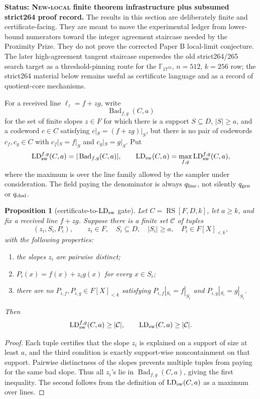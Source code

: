 \documentclass[11pt]{article}
\newtheorem{proposition}{Proposition}
\newcommand{\F}{\mathbb F}
\newcommand{\RS}{\operatorname{RS}}
\newcommand{\qline}{q_{\rm line}}
\newcommand{\qgen}{q_{\rm gen}}
\newcommand{\qchal}{q_{\rm chal}}
\begin{document}
\textbf{Status: \textsc{New-local} finite theorem infrastructure plus
subsumed strict264 proof record.}
The results in this section are deliberately finite and certificate-facing.  They
are meant to move the experimental ledger from lower-bound numerators toward the
integer agreement staircase needed by the Proximity Prize.  They do not prove the
corrected Paper B local-limit conjecture.  The later
high-agreement tangent staircase supersedes the old strict264/265 search target
as a threshold-pinning route for the \(\F_{17^{32}}\), \(n=512\), \(k=256\)
row; the strict264 material below remains useful as certificate language and
as a record of quotient-core mechanisms.

For a received line \(\ell_z=f+zg\), write
\[
  \operatorname{Bad}_{f,g}(C,a)
\]
for the set of finite slopes \(z\in F\) for which there is a support
\(S\subseteq D\), \(|S|\ge a\), and a codeword \(c\in C\) satisfying
\(c|_S=(f+zg)|_S\), but there is no pair of codewords
\(c_f,c_g\in C\) with \(c_f|_S=f|_S\) and \(c_g|_S=g|_S\).  Put
\[
  \operatorname{LD}_{\rm sw}^{f,g}(C,a)
  =|\operatorname{Bad}_{f,g}(C,a)|,
  \qquad
  \operatorname{LD}_{\rm sw}(C,a)
  =\max_{f,g}\operatorname{LD}_{\rm sw}^{f,g}(C,a),
\]
where the maximum is over the line family allowed by the sampler under
consideration.  The field paying the denominator is always \(\qline\), not
silently \(\qgen\) or \(\qchal\).

\begin{proposition}[certificate-to-\(\operatorname{LD}_{\rm sw}\) gate]
\label{prop:certificate-to-ldsw}
Let \(C=\RS[F,D,k]\), let \(a\ge k\), and fix a received line \(f+zg\).  Suppose
there is a finite set \(\mathcal C\) of tuples
\[
  (z_i,S_i,P_i),
  \qquad z_i\in F,
  \quad S_i\subseteq D,
  \quad |S_i|\ge a,
  \quad P_i\in F[X]_{<k},
\]
with the following properties:
\begin{enumerate}
\item the slopes \(z_i\) are pairwise distinct;
\item \(P_i(x)=f(x)+z_i g(x)\) for every \(x\in S_i\);
\item there are no \(P_{i,f},P_{i,g}\in F[X]_{<k}\) satisfying
  \(P_{i,f}|_{S_i}=f|_{S_i}\) and \(P_{i,g}|_{S_i}=g|_{S_i}\).
\end{enumerate}
Then
\[
  \operatorname{LD}_{\rm sw}^{f,g}(C,a)\ge |\mathcal C|,
  \qquad
  \operatorname{LD}_{\rm sw}(C,a)\ge |\mathcal C|.
\]
\end{proposition}

\begin{proof}
Each tuple certifies that the slope \(z_i\) is explained on a support of size at
least \(a\), and the third condition is exactly support-wise noncontainment on
that support.  Pairwise distinctness of the slopes prevents multiple tuples from
paying for the same bad slope.  Thus all \(z_i\)'s lie in
\(\operatorname{Bad}_{f,g}(C,a)\), giving the first inequality.  The second
follows from the definition of \(\operatorname{LD}_{\rm sw}(C,a)\) as a maximum
over lines.
\end{proof}
\end{document}
